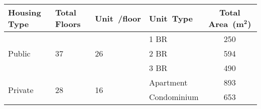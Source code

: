 \begin{table}[H]
	\small
	\begin{tabularx}{\linewidth}{@{}p{1.2cm} X X X c@{}}
		\toprule
		\textbf{Housing Type}    & \textbf{Total Floors} & \textbf{Unit\newline\ /floor} & \textbf{Unit\newline\ Type} & \textbf{Total Area\newline\ ($\textbf{m}^\textbf{2}$)} \\
		\midrule
		\multirow{3}{*}{Public}  & \multirow{3}{*}{37}   & \multirow{3}{*}{26}           & 1 BR                        & 250                                                    \\
		                         &                       &                               & 2 BR                        & 594                                                    \\
		                         &                       &                               & 3 BR                        & 490                                                    \\
		\midrule
		\multirow{2}{*}{Private} & \multirow{2}{*}{28}   & \multirow{2}{*}{16}           & Apartment                   & 893                                                    \\
		                         &                       &                               & Condominium                 & 653                                                    \\
		\bottomrule
	\end{tabularx}
\end{table}
